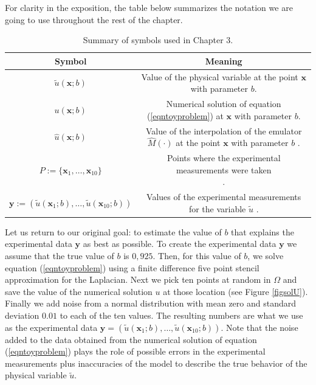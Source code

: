 \documentclass[12pt]{book}
\newcommand{\x}{\textbf{x}}
\newcommand{\y}{\textbf{y}}
\begin{document}
For clarity in the exposition, the table below  summarizes the notation 
we are going to use throughout the rest of the chapter.





\begin{table}[H]
\centering
\begin{tabular}{|c|c|}
\hline 
Symbol & Meaning \tabularnewline 
\hline 
\hline
\hline 
$\tilde{u}(\x;b)$ & \pbox{7cm}{Value of the physical variable at the point $\x$
with parameter $b$.\\} \tabularnewline 
\hline 
\hline
$u(\x;b)$ & \pbox{7cm}{Numerical solution of equation (\ref{eqntoyproblem})
at $\x$ with parameter $b$.\\} \tabularnewline
\hline
\hline 
$\hat{u}(\x;b)$ & \pbox{7cm}{Value of the interpolation of the emulator $\hat{M}(\cdot)$ at the point $\x$ with parameter
$b$\\}.  \tabularnewline
\hline
\hline 
$P:=\{\x_{1},\ldots,\x_{10}\}$ & \pbox{7cm}{Points where the experimental measurements were taken\\}.  \tabularnewline
\hline
\hline 
$\y:=(\tilde{u}(\x_{1};b),\ldots,\tilde{u}(\x_{10};b))$ & \pbox{7cm}{Values of the experimental measurements for the variable $\tilde{u}$\\}.  \tabularnewline
\hline
\end{tabular}

\caption{Summary of symbols used in Chapter 3.}
\label{tabSymboltable}
\end{table}
Let us return to our original goal:  to estimate the value of $b$ that explains  the experimental data 
$\y$ as best as possible. To create the experimental data $\y$ we 
assume that the true value of $b$ is $0,925$. Then, for this value of $b$,  we solve equation (\ref{eqntoyproblem})
using a finite difference five point  stencil approximation for the Laplacian. 
Next we pick  ten points at random in $\Omega$ and save the value of the numerical 
solution $u$ at those location (see Figure \ref{figsolU}).  Finally we add  noise from
a normal distribution with mean zero and standard deviation $0.01$ to each  of the ten values. 
The resulting numbers  are what we use
as the experimental data $\y=(\tilde{u}(\x_{1};b),\ldots,\tilde{u}(\x_{10};b))$. 
Note that the noise added to the data obtained from the
numerical  solution of equation
(\ref{eqntoyproblem}) plays the role of possible  
errors in the experimental measurements plus inaccuracies of the 
model to describe the true behavior of the physical variable $\tilde{u}$.
\end{document}
